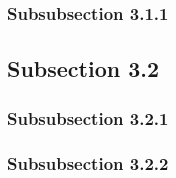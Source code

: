 \subsubsection{Subsubsection 3.1.1}

\blindtext

\subsection{Subsection 3.2}

\blindtext

\subsubsection{Subsubsection 3.2.1}

\blindtext

\subsubsection{Subsubsection 3.2.2}

\blindtext


